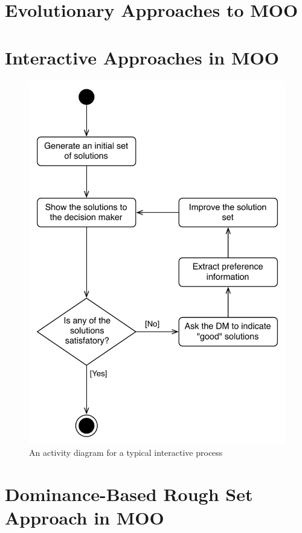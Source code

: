 \section{Evolutionary Approaches to MOO}
\label{sec_ea_in_moo}
\section{Interactive Approaches in MOO}
\label{sec_ia_in_moo}

\begin{figure}
  \centering \includegraphics[scale=0.75]{img/imoprocess_uml}
  \caption{An activity diagram for a typical interactive process}
  \label{imoprocess_uml}
\end{figure}


\section{Dominance-Based Rough Set Approach in MOO}
\label{sec_drsa_in_moo}


